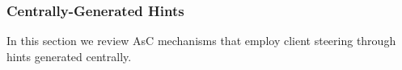 \subsubsection{\textbf{Centrally-Generated Hints}} 
\label{Per-clientAM}
In this section we review AsC mechanisms that employ client steering through hints generated centrally.






%


